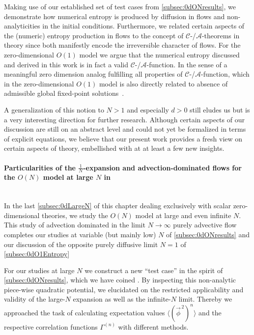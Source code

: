 Making use of our established set of test cases from \cref{subsec:0dONresults}, we demonstrate how numerical entropy is produced by diffusion in \frg{} flows and non-analyticities in the \uv{} initial conditions.
Furthermore, we related certain aspects of the (numeric) entropy production in \frg{} flows to the concept of $\mathcal{C}$-/$\mathcal{A}$-theorems in \rg{} theory since both manifestly encode the irreversible character of \frg{} flows. 
For the zero-dimensional $O(1)$ model we argue that the numerical entropy discussed and derived in this work is in fact a valid $\mathcal{C}$-/$\mathcal{A}$-function.
In the sense of a meaningful zero dimension analog fulfilling all properties of $\mathcal{C}$-/$\mathcal{A}$-function, which in the zero-dimensional $O(1)$ model is also directly related to absence of admissible global fixed-point solutions~\cite{zerod3,Koenigstein:fixedPoint}.

A generalization of this notion to $N>1$ and especially $d>0$ still eludes us but is a very interesting direction for further research.
Although certain aspects of our discussion are still on an abstract level and could not yet be formalized in terms of explicit equations, we believe that our present work provides a fresh view on certain aspects of \grg{} theory, embellished with at at least a few new insights.

\paragraph{Particularities of the $\tfrac{1}{N}$-expansion and advection-dominated \frg{} flows for the $O(N)$ model at large $N$ in \dzero{}}\label{paragraph:0dconclusionLargeN}\mbox{}\\
In the last \cref{subsec:0dLargeN} of this chapter dealing exclusively with scalar zero-dimensional theories, we study the $O(N)$ model at large and even infinite $N$.
This study of advection dominated \dash{} in the limit $N\rightarrow\infty$ purely advective \dash{} \frg{} flow completes our studies at variable (but mainly low) $N$ of \cref{subsec:0dONresults} and our discussion of the opposite \dash{} purely diffusive limit \dash{} $N=1$ of \cref{subsec:0dO1Entropy}

For our studies at large $N$ we construct a new ``test case'' in the spirit of \cref{subsec:0dONresults}, which we have coined .
By inspecting this non-analytic piece-wise quadratic potential, we elucidated on the restricted applicability and validity of the large-$N$ expansion as well as the infinite-$N$ limit.
Thereby we approached the task of calculating expectation values $\langle ( \vec{\phi}^{\, 2} )^n \rangle$ and the respective \ipi{} correlation functions $\Gamma^{(n)}$ with different methods.
	
